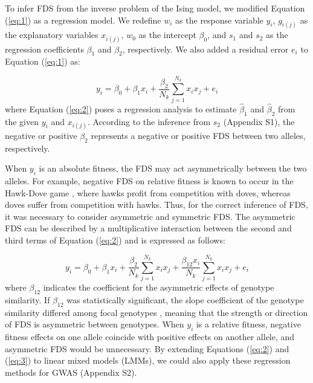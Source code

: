 \documentclass[12pt,]{article}
\begin{document}
To infer FDS from the inverse problem of the Ising model, we modified Equation (\ref{eq:1}) as a regression model. We redefine $w_i$ as the response variable $y_i$, $g_{i(j)}$ as the explanatory variables $x_{i(j)}$, $w_0$ as the intercept $\beta_0$, and $s_1$ and $s_2$ as the regression coefficients $\beta_1$ and $\beta_2$, respectively. We also added a residual error $e_i$ to Equation (\ref{eq:1}) as: 

\begin{equation}
y_i = \beta_0 + \beta_1x_i + \frac{\beta_2}{N_k}\sum^{N_{k}}_{j=1}{x_ix_j} + e_i \label{eq:2}
\end{equation}
\noindent
where Equation (\ref{eq:2}) poses a regression analysis to estimate $\hat{\beta}_1$ and $\hat{\beta}_2$ from the given $y_i$ and $x_{i(j)}$. According to the inference from $s_2$ (Appendix S1), the negative or positive $\beta_2$ represents a negative or positive FDS between two alleles, respectively. 

When $y_i$ is an absolute fitness, the FDS may act asymmetrically between the two alleles. For example, negative FDS on relative fitness is known to occur in the Hawk-Dove game \citep{takahashi2018balanced}, where hawks profit from competition with doves, whereas doves suffer from competition with hawks. Thus, for the correct inference of FDS, it was necessary to consider asymmetric and symmetric FDS. The asymmetric FDS can be described by a multiplicative interaction between the second and third terms of Equation (\ref{eq:2}) \citep{sato2019neighbor} and is expressed as follows:

\begin{equation}
y_i = \beta_0 + \beta_1x_i + \frac{\beta_2}{N_k}\sum^{N_{k}}_{j=1}{x_ix_j} + \frac{\beta_{12}x_i}{N_k}\sum^{N_{k}}_{j=1}{x_ix_j} + e_i \label{eq:3}
\end{equation}
\noindent
where $\beta_{12}$ indicates the coefficient for the asymmetric effects of genotype similarity. If $\beta_{12}$ was statistically significant, the slope coefficient of the genotype similarity differed among focal genotypes \citep{sato2019neighbor}, meaning that the strength or direction of FDS is asymmetric between genotypes. When $y_i$ is a relative fitness, negative fitness effects on one allele coincide with positive effects on another allele, and asymmetric FDS would be unnecessary. By extending Equations (\ref{eq:2}) and (\ref{eq:3}) to linear mixed models (LMMs), we could also apply these regression methods for GWAS (Appendix S2).
\end{document}
